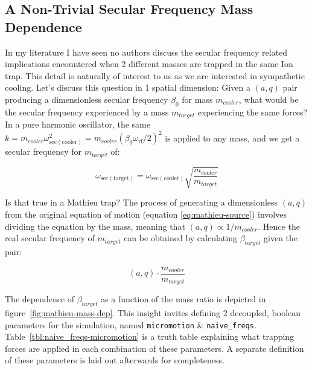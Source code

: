 \subsection{A Non-Trivial Secular Frequency Mass Dependence}\label{ssec:non-trivial-mass-dep}

In my literature I have seen no authors discuss the secular frequency related implications encountered when 2 different masses are trapped in the same Ion trap. This detail is naturally of interest to us as we are interested in sympathetic cooling. Let's discuss this question in 1 spatial dimension: Given a $(a,q)$ pair producing a dimensionless secular frequency $\beta_0$ for mass $m_{cooler}$, what would be the secular frequency experienced by a mass $m_{target}$ experiencing the same forces? In a pure harmonic oscillator, the same $k = m_{cooler} \omega_{\mathrm{sec(cooler)}}^2 = m_{cooler} (\beta_0 \omega_\mathrm{rf}/2)^2$ is applied to any mass, and we get a secular frequency for $m_{target}$ of:

\begin{equation}
	\omega_\mathrm{sec(target)} = \omega_\mathrm{sec(cooler)}\sqrt{\frac{m_{cooler}}{m_{target}}} 
	\label{eq:mathieu-naive-sec-freq}
\end{equation}

Is that true in a Mathieu trap? The process of generating a dimensionless $(a,q)$ from the original equation of motion (equation \ref{eq:mathieu-source}) involves dividing the equation by the mass, meaning that $(a,q)\propto 1/m_{cooler}$. Hence the real secular frequency of $m_{target}$ can be obtained by calculating $\beta_{target}$ given the pair:

$$(a,q)\cdot \frac{m_{cooler}}{m_{target}}$$

The dependence of $\beta_{target}$ as a function of the mass ratio is depicted in figure~\ref{fig:mathieu-mass-dep}. This insight invites defining 2 decoupled, boolean parameters for the simulation, named \texttt{micromotion} \& \texttt{naive\_freqs}. Table~\ref{tbl:naive_freqs-micromotion} is a truth table explaining what trapping forces are applied in each combination of these parameters. A separate definition of these parameters is laid out afterwards for completeness.

